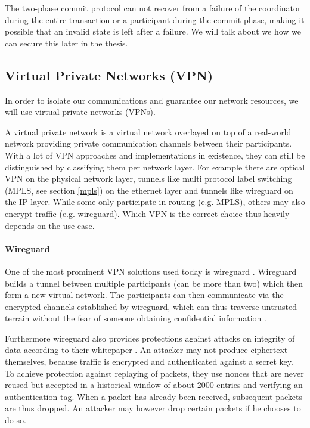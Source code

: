 The two-phase commit protocol can not recover from a failure of the coordinator during the entire transaction or a participant during the commit phase, making it possible that an invalid state is left after a failure. We will talk about we how we can secure this later in the thesis.


\subsection{Virtual Private Networks (VPN)}
In order to isolate our communications and guarantee our network resources, we will use virtual private networks (VPNs).

A virtual private network \cite{vpn} is a virtual network overlayed on top of a real-world network providing private communication channels between their participants. With a lot of VPN approaches and implementations in existence, they can still be distinguished by classifying them per network layer. For example there are optical VPN on the physical network layer, tunnels like multi protocol label switching (MPLS, see section \ref{mpls}) on the ethernet layer and tunnels like wireguard \cite{wireguard} on the IP layer. While some only participate in routing (e.g. MPLS), others may also encrypt traffic (e.g. wireguard). Which VPN is the correct choice thus heavily depends on the use case.

\paragraph{Wireguard} One of the most prominent VPN solutions used today is wireguard \cite{wireguard}. Wireguard builds a tunnel between multiple participants (can be more than two) which then form a new virtual network. The participants can then communicate via the encrypted channels established by wireguard, which can thus traverse untrusted terrain without the fear of someone obtaining confidential information \cite{wireguard}.

Furthermore wireguard also provides protections against attacks on integrity of data according to their whitepaper \cite{wireguard}. An attacker may not produce ciphertext themselves, because traffic is encrypted and authenticated against a secret key. To achieve protection against replaying of packets, they use nonces that are never reused but accepted in a historical window of about 2000 entries and verifying an authentication tag. When a packet has already been received, subsequent packets are thus dropped. An attacker may however drop certain packets if he chooses to do so.

